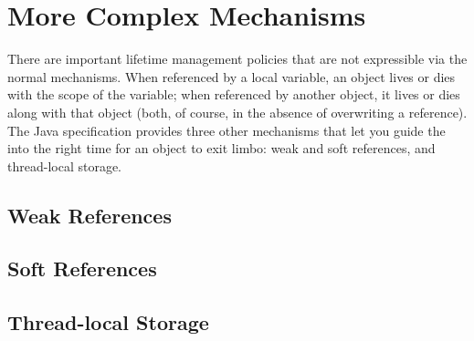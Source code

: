 \section{More Complex Mechanisms}
There are important lifetime management policies that are not expressible via the
normal mechanisms. When referenced by a local variable, an object lives or dies
with the scope of the variable; when referenced by another object, it lives or
dies along with that object (both, of course, in the absence of overwriting a
reference). The Java specification provides three other mechanisms that let you
guide the \jre into the right time for an object to exit limbo: weak and soft
references, and thread-local storage.

\subsection{Weak References}

\subsection{Soft References}


\subsection{Thread-local Storage}


